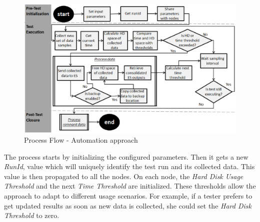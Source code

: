 \documentclass[runningheads,a4paper]{llncs}
\begin{document}

\begin{figure}[!h]
\centering
\includegraphics[totalheight=.34\textheight,width=1.0\textwidth]{ApproachDiagram}
\caption{Process Flow - Automation approach}
\label{fig_ApproachDiagram}
\end{figure}


The process starts by initializing the configured parameters. Then it gets a new
\emph{RunId}, value which will uniquely identify the test run and its collected data. This value is then
propagated to all the nodes. On each node, the \emph{Hard Disk Usage Threshold} and  
the next \emph{Time Threshold} are initialized. These thresholds allow the
approach to adapt to different usage scenarios. For example, if a tester
prefers to get updated results as soon as new data is collected, she could set the \emph{Hard Disk Threshold} to zero. 
\end{document}

